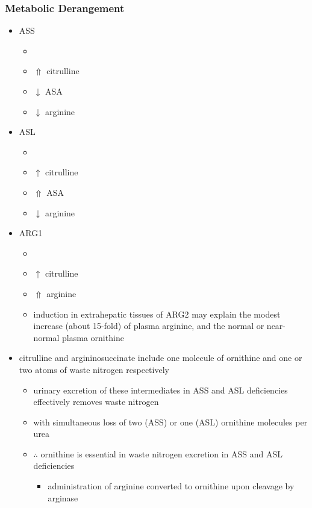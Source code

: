 \documentclass{scrartcl}
\begin{document}
\subsubsection{Metabolic Derangement}
\label{sec:org9b24501}
\begin{itemize}
\item ASS
\begin{itemize}
\item {}
\item \(\Uparrow\) citrulline
\item \(\downarrow\) ASA
\item \(\downarrow\) arginine
\end{itemize}
\item ASL
\begin{itemize}
\item {}
\item \(\uparrow\) citrulline
\item \(\Uparrow\) ASA
\item \(\downarrow\) arginine
\end{itemize}
\item ARG1
\begin{itemize}
\item {}
\item \(\uparrow\) citrulline
\item \(\Uparrow\) arginine
\item induction in extrahepatic tissues of ARG2 may explain the modest
increase (about 15-fold) of plasma arginine, and the normal or
near-normal plasma ornithine
\end{itemize}
\end{itemize}


\begin{itemize}
\item citrulline and argininosuccinate include one molecule of ornithine
and one or two atoms of waste nitrogen respectively
\begin{itemize}
\item urinary excretion of these intermediates in ASS and ASL
deficiencies effectively removes waste nitrogen
\item with simultaneous loss of two (ASS) or one (ASL) ornithine
molecules per urea
\item \(\therefore\) ornithine is essential in waste nitrogen excretion in
ASS and ASL deficiencies
\begin{itemize}
\item administration of arginine converted to ornithine upon cleavage by arginase
\end{itemize}
\end{itemize}
\end{itemize}
\end{document}
